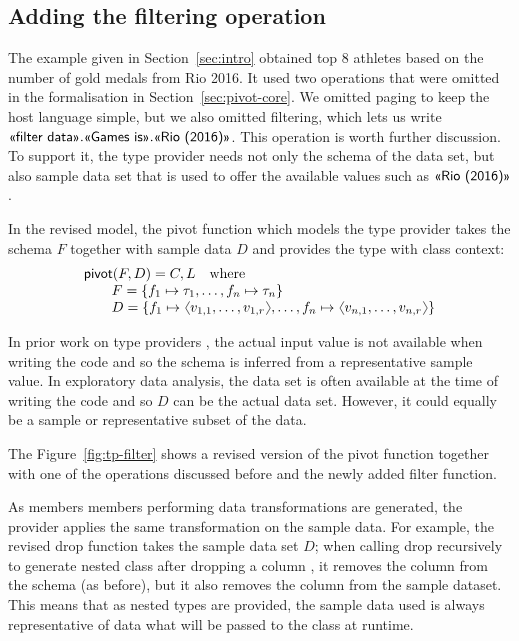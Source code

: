 \documentclass[a4paper,UKenglish]{lipics-v2016}
\theoremstyle{plain}
\theoremstyle{definition}
\newcommand{\vect}[1]{\langl #1 \rangl}
\newcommand{\langl}{\begin{picture}(4.5,7)
\put(1.1,2.5){\rotatebox{60}{\line(1,0){5.5}}}
\put(1.1,2.5){\rotatebox{300}{\line(1,0){5.5}}}
\end{picture}}
\newcommand{\rangl}{\begin{picture}(4.5,7)
\put(.9,2.5){\rotatebox{120}{\line(1,0){5.5}}}
\put(.9,2.5){\rotatebox{240}{\line(1,0){5.5}}}
\end{picture}}
\newcommand{\ball}[1]{\FPeval{\result}{clip(201+#1)}\textnormal{\ding{\result}}}
\newcommand{\ident}[1]{\textnormal{\sffamily #1}}
\newcommand{\qident}[1]{\textnormal{\sffamily \guillemotleft #1\guillemotright}}
\begin{document}

\subsection{Adding the filtering operation}
\label{sec:pivot-filter}

The example given in Section~\ref{sec:intro} obtained top 8 athletes based on the number
of gold medals from Rio 2016. It used two operations that were omitted in the formalisation in
Section~\ref{sec:pivot-core}. We omitted paging to keep the host language simple, but we also
omitted filtering, which lets us write $\qident{filter data}.\qident{Games is}.\qident{Rio (2016)}$.
This operation is worth further discussion. To support it, the type provider needs not only the
schema of the data set, but also sample data set that is used to offer the available values such 
as $\qident{Rio (2016)}$.

\noindent
In the revised model, the \ident{pivot} function which models the type provider takes the schema
$F$ together with sample data $D$ and provides the type with class context:
%
\begin{equation*}
\begin{array}{l}
\ident{pivot}(F, D) = C, L \quad \textnormal{where}\\
\qquad F=\{ f_1 \mapsto \tau_1, \ldots, f_n \mapsto \tau_n \}\\
\qquad D=\{ f_1\mapsto \vect{v_{1,1},\ldots,v_{1,r}}, \ldots, f_n\mapsto \vect{v_{n,1},\ldots,v_{n,r}}\} 
\end{array}
\end{equation*}

\noindent
In prior work on type providers \cite{fsdata}, the actual input value is not available when writing the code
and so the schema is inferred from a representative sample value. In exploratory data analysis, the 
data set is often available at the time of writing the code and so $D$ can be the actual data set.
However, it could equally be a sample or representative subset of the data.

The Figure~\ref{fig:tp-filter} shows a revised version of the \ident{pivot} function \ball{1} 
together with one of the operations discussed before and the newly added \ident{filter} function. 

As members members performing data transformations are generated, the provider applies the same
transformation on the sample data. For example, the revised \ident{drop} function \ball{2} takes
the sample data set $D$; when calling \ident{drop} recursively to generate nested class after
dropping a column \ball{3}, it removes the column from the schema (as before), but it also removes
the column from the sample dataset. This means that as nested types are provided, the sample data
used is always representative of data what will be passed to the class at runtime. 
\end{document}
